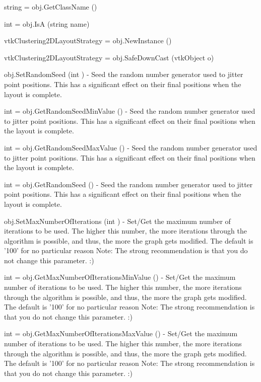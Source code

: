 \begin{DoxyItemize}
\item {\ttfamily string = obj.\-Get\-Class\-Name ()}  
\item {\ttfamily int = obj.\-Is\-A (string name)}  
\item {\ttfamily vtk\-Clustering2\-D\-Layout\-Strategy = obj.\-New\-Instance ()}  
\item {\ttfamily vtk\-Clustering2\-D\-Layout\-Strategy = obj.\-Safe\-Down\-Cast (vtk\-Object o)}  
\item {\ttfamily obj.\-Set\-Random\-Seed (int )} -\/ Seed the random number generator used to jitter point positions. This has a significant effect on their final positions when the layout is complete.  
\item {\ttfamily int = obj.\-Get\-Random\-Seed\-Min\-Value ()} -\/ Seed the random number generator used to jitter point positions. This has a significant effect on their final positions when the layout is complete.  
\item {\ttfamily int = obj.\-Get\-Random\-Seed\-Max\-Value ()} -\/ Seed the random number generator used to jitter point positions. This has a significant effect on their final positions when the layout is complete.  
\item {\ttfamily int = obj.\-Get\-Random\-Seed ()} -\/ Seed the random number generator used to jitter point positions. This has a significant effect on their final positions when the layout is complete.  
\item {\ttfamily obj.\-Set\-Max\-Number\-Of\-Iterations (int )} -\/ Set/\-Get the maximum number of iterations to be used. The higher this number, the more iterations through the algorithm is possible, and thus, the more the graph gets modified. The default is '100' for no particular reason Note\-: The strong recommendation is that you do not change this parameter. \-:)  
\item {\ttfamily int = obj.\-Get\-Max\-Number\-Of\-Iterations\-Min\-Value ()} -\/ Set/\-Get the maximum number of iterations to be used. The higher this number, the more iterations through the algorithm is possible, and thus, the more the graph gets modified. The default is '100' for no particular reason Note\-: The strong recommendation is that you do not change this parameter. \-:)  
\item {\ttfamily int = obj.\-Get\-Max\-Number\-Of\-Iterations\-Max\-Value ()} -\/ Set/\-Get the maximum number of iterations to be used. The higher this number, the more iterations through the algorithm is possible, and thus, the more the graph gets modified. The default is '100' for no particular reason Note\-: The strong recommendation is that you do not change this parameter. \-:)  

\end{DoxyItemize}
